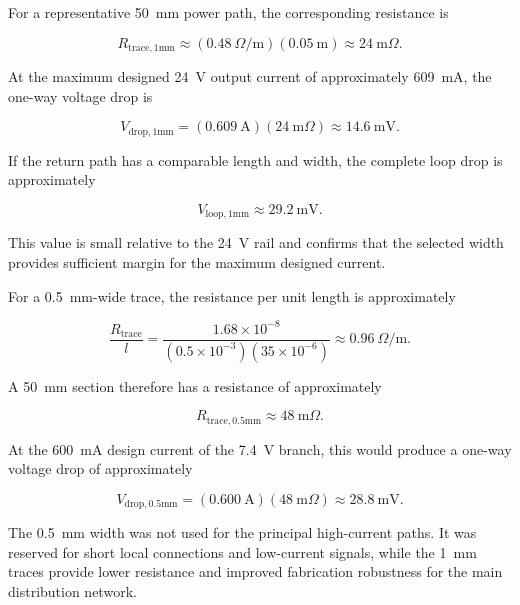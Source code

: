 For a representative 50~mm power path, the corresponding resistance is

\begin{equation}
R_{\mathrm{trace,1mm}}
\approx
(0.48~\Omega/\mathrm{m})(0.05~\mathrm{m})
\approx 24~\mathrm{m}\Omega.
\end{equation}

At the maximum designed 24~V output current of approximately 609~mA, the one-way voltage drop is

\begin{equation}
V_{\mathrm{drop,1mm}}
=
(0.609~\mathrm{A})(24~\mathrm{m}\Omega)
\approx 14.6~\mathrm{mV}.
\end{equation}

If the return path has a comparable length and width, the complete loop drop is approximately

\begin{equation}
V_{\mathrm{loop,1mm}}
\approx 29.2~\mathrm{mV}.
\end{equation}

This value is small relative to the 24~V rail and confirms that the selected width provides sufficient margin for the maximum designed current.

For a 0.5~mm-wide trace, the resistance per unit length is approximately

\begin{equation}
\frac{R_{\mathrm{trace}}}{l}
=
\frac{1.68\times10^{-8}}
{(0.5\times10^{-3})(35\times10^{-6})}
\approx 0.96~\Omega/\mathrm{m}.
\end{equation}

A 50~mm section therefore has a resistance of approximately

\begin{equation}
R_{\mathrm{trace,0.5mm}}
\approx 48~\mathrm{m}\Omega.
\end{equation}

At the 600~mA design current of the 7.4~V branch, this would produce a one-way voltage drop of approximately

\begin{equation}
V_{\mathrm{drop,0.5mm}}
=
(0.600~\mathrm{A})(48~\mathrm{m}\Omega)
\approx 28.8~\mathrm{mV}.
\end{equation}

The 0.5~mm width was not used for the principal high-current paths. It was reserved for short local connections and low-current signals, while the 1~mm traces provide lower resistance and improved fabrication robustness for the main distribution network.

